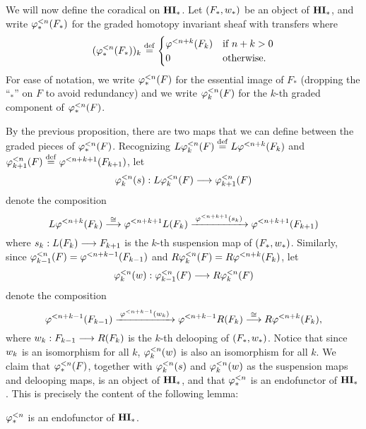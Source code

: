 We will now define the coradical on $\HM$. Let $(F_*, \deloop_*)$ 
be an object of $\HM$, and write $\tlHM{n}(F_*)$ for the graded 
homotopy invariant sheaf with transfers where
\[
(\tlHM{n}(F_*))_k \defeq
\begin{cases}
   \tlHI{n + k}(F_k) & \textrm{if } n + k > 0 \\
   0                 & \textrm{otherwise}.
\end{cases}
\]
For ease of notation, we write $\tlHM{n}(F)$ for the essential 
image of $F_*$ (dropping the ``$_*$'' on $F$ to avoid 
redundancy) and we write $\tlHM[k]{n}(F)$ for the $k$-th graded 
component of $\tlHM{n}(F)$.

By the previous proposition, there are two maps that we can
define between the graded pieces of $\tlHM{n}(F)$. Recognizing
$L\tlHM[k]{n}(F) \defeq L \tlHI{n + k}(F_k)$ and 
$\tlHM[k + 1]{n}(F) \defeq \tlHI{n + k + 1}(F_{k + 1})$, let
\[
\suspTL[k]{n} : L\tlHM[k]{n}(F) \to \tlHM[k + 1]{n}(F)
\]
denote the composition
\begin{equation}\label{eq_susp_def}
L \tlHI{n + k}(F_k) \stackrel{\cong}{\to} 
   \tlHI{n + k + 1}L(F_k) 
   \xrightarrow{\;\tlHI{n + k + 1}(\susp_k)\;} 
   \tlHI{n + k + 1}(F_{k + 1})
\end{equation}
where $\susp_k: L(F_k) \to F_{k + 1}$ is the $k$-th suspension 
map of $(F_*, \deloop_*)$. Similarly, since $\tlHM[k - 1]{n}(F) = 
\tlHI{n + k - 1}(F_{k - 1})$ and $R \tlHM[k]{n}(F) = 
R\tlHI{n + k}(F_{k})$, let
\[
\deloopTL[k]{n} : \tlHM[k - 1]{n}(F) \to R \tlHM[k]{n}(F) 
\]
denote the composition
\begin{equation}\label{eq_deloop_def}
\tlHI{n + k - 1}(F_{k - 1})
   \xrightarrow{\;\tlHI{n + k - 1}(\deloop_k)\;} 
   \tlHI{n + k - 1} R(F_k) \stackrel{\cong}{\to} 
   R \tlHI{n + k}(F_k),
\end{equation}
where $\deloop_k: F_{k - 1} \to R(F_k)$ is the $k$-th delooping
of $(F_*, \deloop_*)$. Notice that since $\deloop_k$ is an isomorphism 
for all $k$, $\deloopTL[k]{n}$ is also an isomorphism for 
all $k$. We claim that $\tlHM{n}(F)$, together with $\suspTL[k]{n}$ and
$\deloopTL[k]{n}$ as the suspension maps and delooping maps,
is an object of $\HM$, and that $\tlHM{n}$ is an endofunctor of $\HM$.
This is precisely the content of the following lemma:

\begin{lem}\label{lem_tlHM_is_functor}
$\tlHM{n}$ is an endofunctor of $\HM$.
\end{lem}

